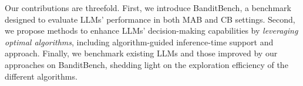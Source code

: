 Our contributions are threefold. First, we introduce BanditBench, a benchmark designed to evaluate LLMs' performance in both MAB and CB settings. Second, we propose methods to enhance LLMs' decision-making capabilities by \emph{leveraging optimal algorithms}, including algorithm-guided inference-time support and \ad approach. Finally, we benchmark existing LLMs and those improved by our approaches on BanditBench, shedding light on the exploration efficiency of the different algorithms. 